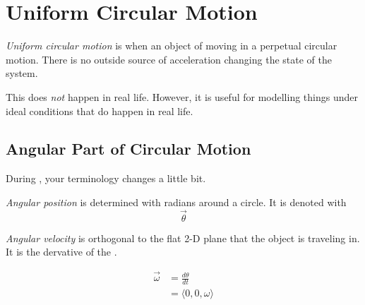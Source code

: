 \section{Uniform Circular Motion} \label{sec:Uniform Circular Motion}
\begin{definition} \label{def:Uniform Circular Motion}
  \emph{Uniform circular motion} is when an object of moving in a perpetual circular motion.
  There is no outside source of acceleration changing the state of the system.
  \begin{remark}
    This does \emph{not} happen in real life.
    However, it is useful for modelling things under ideal conditions that do happen in real life.
  \end{remark}
\end{definition}

\subsection{Angular Part of Circular Motion} \label{subsec:Angular Circular Motion}
During , your terminology changes a little bit.
\begin{definition} \label{def:Angular Position}
  \emph{Angular position} is determined with radians around a circle.
  It is denoted with \[ \vec{\theta} \]
\end{definition}

\begin{definition} \label{def:Angular Velocity}
  \emph{Angular velocity} is orthogonal to the flat 2-D plane that the object is traveling in.
  It is the dervative of the .

  \begin{equation} \label{eq:Angular Velocity}
    \begin{aligned}
      \vec{\omega} &= \frac{d \theta}{dt} \\
      &= \langle 0, 0, \omega \rangle \\
    \end{aligned}
  \end{equation}
\end{definition}

